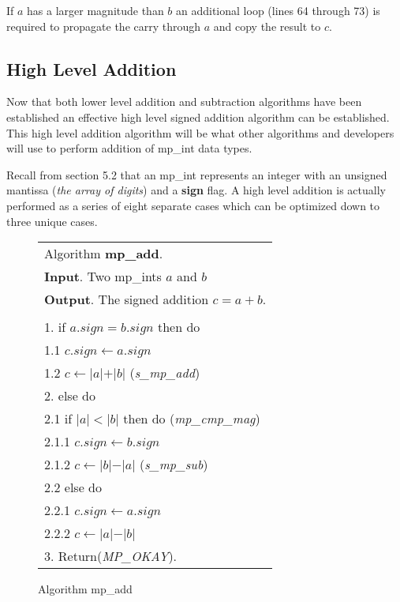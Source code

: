 \documentclass[b5paper]{book}
\begin{document}
If $a$ has a larger magnitude than $b$ an additional loop (lines 64 through 73) is required to propagate 
the carry through $a$ and copy the result to $c$.  

\subsection{High Level Addition}
Now that both lower level addition and subtraction algorithms have been established an effective high level signed addition algorithm can be
established.  This high level addition algorithm will be what other algorithms and developers will use to perform addition of mp\_int data 
types.  

Recall from section 5.2 that an mp\_int represents an integer with an unsigned mantissa (\textit{the array of digits}) and a \textbf{sign} 
flag.  A high level addition is actually performed as a series of eight separate cases which can be optimized down to three unique cases.

\begin{figure}[!here]
\begin{center}
\begin{tabular}{l}
\hline Algorithm \textbf{mp\_add}. \\
\textbf{Input}.   Two mp\_ints $a$ and $b$  \\
\textbf{Output}.  The signed addition $c = a + b$. \\
\hline \\
1.  if $a.sign = b.sign$ then do \\
\hspace{3mm}1.1  $c.sign \leftarrow a.sign$  \\
\hspace{3mm}1.2  $c \leftarrow \vert a \vert + \vert b \vert$ (\textit{s\_mp\_add})\\
2.  else do \\
\hspace{3mm}2.1  if $\vert a \vert < \vert b \vert$ then do (\textit{mp\_cmp\_mag})  \\
\hspace{6mm}2.1.1  $c.sign \leftarrow b.sign$ \\
\hspace{6mm}2.1.2  $c \leftarrow \vert b \vert - \vert a \vert$ (\textit{s\_mp\_sub}) \\
\hspace{3mm}2.2  else do \\
\hspace{6mm}2.2.1  $c.sign \leftarrow a.sign$ \\
\hspace{6mm}2.2.2  $c \leftarrow \vert a \vert - \vert b \vert$ \\
3.  Return(\textit{MP\_OKAY}). \\
\hline
\end{tabular}
\end{center}
\caption{Algorithm mp\_add}
\end{figure}
\end{document}
